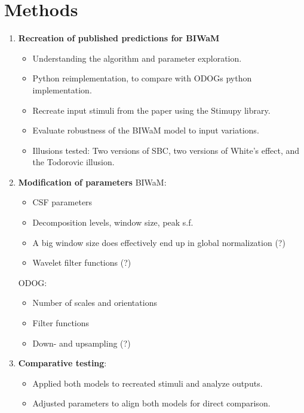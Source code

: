 \newpage

\section{Methods}  %
    \begin{enumerate}
        \item \textbf{Recreation of published predictions for BIWaM}
        \begin{itemize}
            \item Understanding the algorithm and parameter exploration.
            \item Python reimplementation, to compare with ODOGs python implementation.
            \item Recreate input stimuli from the paper using the Stimupy library.
            \item Evaluate robustness of the BIWaM model to input variations.
            \item Illusions tested: Two versions of SBC, two versions of White’s effect, and the Todorovic illusion.
        \end{itemize}
    
        \item \textbf{Modification of parameters} \newline BIWaM:
        \begin{itemize} 
            \item CSF parameters
            \item Decomposition levels, window size, peak s.f.
            \item A big window size does effectively end up in global normalization (?)
            \item Wavelet filter functions (?)
        \end{itemize}
        ODOG:
        \begin{itemize} 
            \item Number of scales and orientations 
            \item Filter functions
            \item Down- and upsampling (?)
        \end{itemize}
    
        \item \textbf{Comparative testing}:
        \begin{itemize}
            \item Applied both models to recreated stimuli and analyze outputs.
            \item Adjusted parameters to align both models for direct comparison.
        \end{itemize}
    \end{enumerate}

